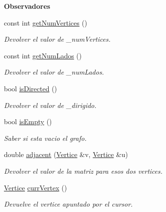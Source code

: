 \begin{Indent}{\bf Observadores}\par
\begin{DoxyCompactItemize}
\item 
const int \hyperlink{classed_1_1Grafo_a8a1e1c5f1986990b8245a4884a72bf67}{get\+Num\+Vertices} ()
\begin{DoxyCompactList}\small\item\em Devolver el valor de \+\_\+num\+Vertices. \end{DoxyCompactList}\item 
const int \hyperlink{classed_1_1Grafo_a0124bed42b9a3f9770b39204b5d80573}{get\+Num\+Lados} ()
\begin{DoxyCompactList}\small\item\em Devolver el valor de \+\_\+num\+Lados. \end{DoxyCompactList}\item 
bool \hyperlink{classed_1_1Grafo_ad9647cbb0b06eaac62cfc90ef858205a}{is\+Directed} ()
\begin{DoxyCompactList}\small\item\em Devolver el valor de \+\_\+dirigido. \end{DoxyCompactList}\item 
bool \hyperlink{classed_1_1Grafo_a45e4e80219294abe6d4d7f33c2be9ae9}{is\+Empty} ()
\begin{DoxyCompactList}\small\item\em Saber si esta vacio el grafo. \end{DoxyCompactList}\item 
double \hyperlink{classed_1_1Grafo_a27ec9a3643117687016748d94df1095d}{adjacent} (\hyperlink{classed_1_1Vertice}{Vertice} \&v, \hyperlink{classed_1_1Vertice}{Vertice} \&u)
\begin{DoxyCompactList}\small\item\em Devolver el valor de la matriz para esos dos vertices. \end{DoxyCompactList}\item 
\hyperlink{classed_1_1Vertice}{Vertice} \hyperlink{classed_1_1Grafo_a0e5a24737604824659a2fce1ba5d8421}{curr\+Vertex} ()
\begin{DoxyCompactList}\small\item\em Devuelve el vertice apuntado por el cursor. \end{DoxyCompactList}\end{DoxyCompactItemize}
\end{Indent}

